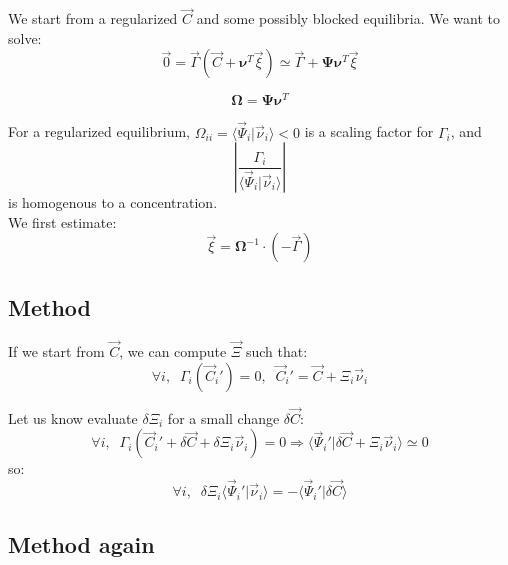 \documentclass[aps,12pt]{revtex4}
\begin{document}
We start from a regularized $\vec{C}$ and some possibly blocked equilibria. We 
want to solve:
\begin{equation}
	\vec{0} = 	\vec{\Gamma}(\vec{C}+\bm{\nu}^T \vec{\xi}) \simeq \vec{\Gamma} + \bm{\Psi} \bm{\nu}^T \vec{\xi}
\end{equation}

\begin{equation}
	\bm{\Omega} = \bm{\Psi} \bm{\nu}^T
\end{equation}	

For a regularized equilibrium, $\Omega_{ii}=\langle \vec{\Psi}_i \vert \vec{\nu}_i \rangle < 0$ is
a scaling factor for $\Gamma_i$, and
\begin{equation}
	\left\vert \dfrac{\Gamma_i}{\langle \vec{\Psi}_i \vert \vec{\nu}_i \rangle} \right\vert
\end{equation}
is homogenous to a concentration.\\
We first estimate:
\begin{equation}
	\vec{\xi} =  {\bm{\Omega}}^{-1} \cdot (-\vec{\Gamma} )
\end{equation}

\subsection{Method}

If we start from $\vec{C}$, we can compute $\vec{\Xi}$ such that:
\begin{equation}
	\forall i, \;\; \Gamma_i(\vec{C}_i') = 0, \;\; \vec{C}_i' = \vec{C} + \Xi_i \vec{\nu}_i
\end{equation}

Let us know evaluate $\delta\Xi_i$ for a small change $\delta\vec{C}$:
\begin{equation}
	\forall i, \;\;  \Gamma_i(\vec{C}_i' + \delta\vec{C} + \delta\Xi_i \vec{\nu}_i) = 0 \Rightarrow 
	\langle \vec{\Psi}_i' \vert \delta\vec{C} +   \Xi_i \vec{\nu}_i \rangle \simeq 0 
\end{equation}
so:
\begin{equation}
	\forall i, \;\; \delta\Xi_i \langle \vec{\Psi}_i' \vert \vec{\nu}_i \rangle
	 = -  \langle\vec{\Psi}_i' \vert \delta\vec{C} \rangle
\end{equation}
  	

\subsection{Method again}
\end{document}
